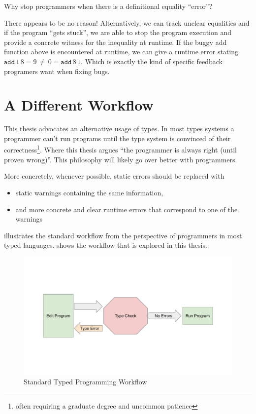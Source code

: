 Why stop programmers when there is a definitional equality ``error''? 

There appears to be no reason! Alternatively, we can track unclear equalities and if the program ``gets stuck'', we are able to stop the program execution and provide a concrete witness for the inequality at runtime.
If the buggy add function above is encountered at runtime, we can give a runtime error stating $\mathtt{add}\,1\,8=9\,\neq\,0=\mathtt{add}\,8\,1$.
Which is exactly the kind of specific feedback programers want when fixing bugs.

\section{A Different Workflow}

This thesis advocates an alternative usage of types. In most types systems a programmer can't run programs until the type system is convinced of their correctness\footnote{
 often requiring a graduate degree and uncommon patience}.
Where this thesis argues ``the programmer is always right (until proven wrong)''.
This philosophy will likely go over better with programmers.

More concretely, whenever possible, static errors should be replaced with
\begin{itemize}
\item static warnings containing the same information,
\item and more concrete and clear runtime errors that correspond to one of the warnings
\end{itemize}
 illustrates the standard workflow from the perspective of programmers in most typed languages.
 shows the workflow that is explored in this thesis.

\begin{figure}

\includegraphics[width=5in]{fig/standardWorkflow.pdf}

\caption{Standard Typed Programming Workflow}
\label{fig:intro-standard-workflow}
\end{figure}

